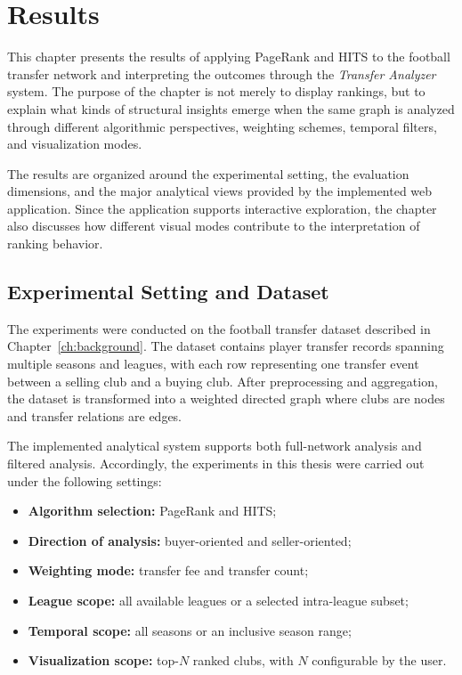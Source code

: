 \chapter{Results}
\label{ch:results}

This chapter presents the results of applying PageRank and HITS to the football transfer network and interpreting the outcomes through the \textit{Transfer Analyzer} system. The purpose of the chapter is not merely to display rankings, but to explain what kinds of structural insights emerge when the same graph is analyzed through different algorithmic perspectives, weighting schemes, temporal filters, and visualization modes.

The results are organized around the experimental setting, the evaluation dimensions, and the major analytical views provided by the implemented web application. Since the application supports interactive exploration, the chapter also discusses how different visual modes contribute to the interpretation of ranking behavior.


\section{Experimental Setting and Dataset}
\label{sec:results_setting}

The experiments were conducted on the football transfer dataset described in Chapter~\ref{ch:background}. The dataset contains player transfer records spanning multiple seasons and leagues, with each row representing one transfer event between a selling club and a buying club. After preprocessing and aggregation, the dataset is transformed into a weighted directed graph where clubs are nodes and transfer relations are edges.

The implemented analytical system supports both full-network analysis and filtered analysis. Accordingly, the experiments in this thesis were carried out under the following settings:
\begin{itemize}
    \item \textbf{Algorithm selection:} PageRank and HITS;
    \item \textbf{Direction of analysis:} buyer-oriented and seller-oriented;
    \item \textbf{Weighting mode:} transfer fee and transfer count;
    \item \textbf{League scope:} all available leagues or a selected intra-league subset;
    \item \textbf{Temporal scope:} all seasons or an inclusive season range;
    \item \textbf{Visualization scope:} top-$N$ ranked clubs, with $N$ configurable by the user.
\end{itemize}

